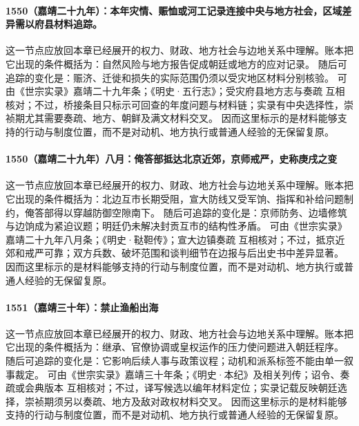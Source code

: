 \paragraph{1550（嘉靖二十九年）：本年灾情、赈恤或河工记录连接中央与地方社会，区域差异需以府县材料追踪。} 这一节点应放回本章已经展开的权力、财政、地方社会与边地关系中理解。账本把它出现的条件概括为：自然风险与地方报告促成朝廷或地方的应对记录。 随后可追踪的变化是：赈济、迁徙和损失的实际范围仍须以受灾地区材料分别核验。 可由《世宗实录》嘉靖二十九年条；《明史·五行志》；受灾府县地方志与奏疏 互相核对；不过，桥接条目只标示可回查的年度问题与材料链；实录有中央选择性，崇祯期尤其需要奏疏、地方、朝鲜及满文材料交叉。 因而这里标示的是材料能够支持的行动与制度位置，而不是对动机、地方执行或普通人经验的无保留复原。

\paragraph{1550（嘉靖二十九年）八月：俺答部抵达北京近郊，京师戒严，史称庚戌之变} 这一节点应放回本章已经展开的权力、财政、地方社会与边地关系中理解。账本把它出现的条件概括为：北边互市长期受阻，宣大防线又受军饷、指挥和补给问题制约，俺答部得以穿越防御空隙南下。 随后可追踪的变化是：京师防务、边墙修筑与边饷成为紧迫议题；明廷仍未解决封贡互市的结构性矛盾。 可由《世宗实录》嘉靖二十九年八月条；《明史·鞑靼传》；宣大边镇奏疏 互相核对；不过，抵京近郊和戒严可靠；双方兵数、破坏范围和谈判细节在边报与后出史书中差异显著。 因而这里标示的是材料能够支持的行动与制度位置，而不是对动机、地方执行或普通人经验的无保留复原。

\paragraph{1551（嘉靖三十年）：禁止渔船出海} 这一节点应放回本章已经展开的权力、财政、地方社会与边地关系中理解。账本把它出现的条件概括为：继承、官僚协调或皇权运作的压力使问题进入朝廷程序。 随后可追踪的变化是：它影响后续人事与政策议程；动机和派系标签不能由单一叙事裁定。 可由《世宗实录》嘉靖三十年条；《明史·本纪》及相关列传；诏令、奏疏或会典版本 互相核对；不过，译写候选以编年材料定位；实录记载反映朝廷选择，崇祯期须另以奏疏、地方及敌对政权材料交叉。 因而这里标示的是材料能够支持的行动与制度位置，而不是对动机、地方执行或普通人经验的无保留复原。

